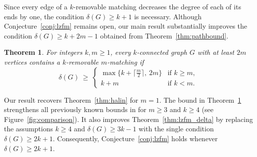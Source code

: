 \documentclass[11pt]{article}
\numberwithin{equation}{section}
\newtheorem{theorem}{Theorem}[section]
\begin{document}
Since every edge of a $k$-removable matching decreases the degree of each of its ends by one, the condition $\delta(G)\ge k+1$ is necessary. Although Conjecture~\ref{conj:lzfm} remains open, our main result substantially improves the condition $\delta(G)\ge k+2m-1$ obtained from Theorem~\ref{thm:pathbound}.

\begin{theorem}\label{thm:main:1}
For integers $k, m\ge 1$,  every $k$-connected graph $G$  with at least $2m$ vertices contains a $k$-removable $m$-matching if \[
   \delta(G)\ \ge\
   \begin{cases}
      \max\bigl\{k+\bigl\lceil\tfrac m2\bigr\rceil,\ 2m\bigr\}
         & \text{if } k\ge m,\\[2pt]
      k+m & \text{if } k<m.
   \end{cases}\]
\end{theorem}

Our result recovers Theorem~\ref{thm:halin} for $m=1$. 
The bound in Theorem~\ref{thm:main:1} strengthens all previously known bounds in \cite{lzfm} for $m\ge 3$ and $k\ge 4$ (see Figure~\ref{fig:comparison}). It also improves Theorem~\ref{thm:lzfm_delta} by replacing the assumptions $k\ge4$ and $\delta(G)\ge3k-1$ with the single condition $\delta(G)\ge2k+1$.
Consequently, Conjecture~\ref{conj:lzfm} holds whenever $\delta(G)\ge 2k+1$.
 
\end{document}
